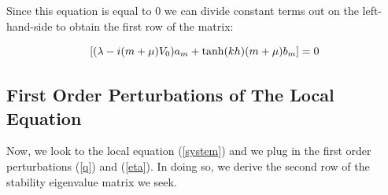 \documentclass{article}
\begin{document}
\vspace{-20}

Since this equation is equal to 0 we can divide constant terms out on the left-hand-side to obtain the first row of the matrix:

\vspace{15} 

\begin{equation} \label{matrixrow1}
   [(\lambda - i(m+\mu)V_{0})a_{m} + \tanh(kh)(m+\mu)b_{m} ] = 0 
\\
\end{equation}

\vspace{15}

\subsection{First Order Perturbations of The Local Equation}

\vspace{15}

Now, we look to the local equation (\ref{system}) and we plug in the first order perturbations (\ref{q}) and (\ref{eta}). In doing so, we derive the second row of the stability eigenvalue matrix we seek.

\vspace{-10} 
\end{document}
